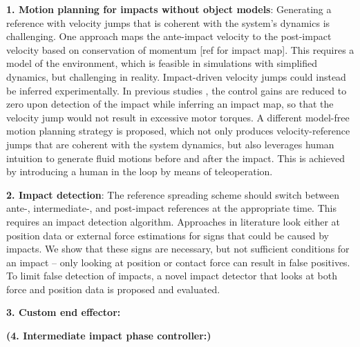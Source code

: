 \documentclass[a4paper, 10pt, conference]{ieeeconf}
\begin{document}
    \textbf{1. Motion planning for impacts without object models}: Generating a reference with velocity jumps that is coherent with the system’s dynamics is challenging. 
    One approach maps the ante-impact velocity to the post-impact velocity based on conservation of momentum [ref for impact map]. This requires a model of the environment, which is feasible in simulations with simplified dynamics, but challenging in reality.
    Impact-driven velocity jumps could instead be inferred experimentally. In previous studies \cite{aouajPredictingPostImpactVelocity2021}, the control gains are reduced to zero upon detection of the impact while inferring an impact map, so that the velocity jump would not result in excessive motor torques.
    A different model-free motion planning strategy is proposed, which not only produces velocity-reference jumps that are coherent with the system dynamics, but also leverages human intuition to generate fluid motions before and after the impact. This is achieved by introducing a human in the loop by means of teleoperation. %

    \textbf{2. Impact detection}: The reference spreading scheme should switch between ante-, intermediate-, and post-impact references at the appropriate time. This requires an impact detection algorithm. Approaches in literature look either at position data \cite{rijnenMotionSignalsVelocity2018} or external force estimations \cite{uitendaalTeachingRobotsInteraction2022,properAimAwareCollisionMonitoring2021,properValidationNumericalSimultaneous2022} for signs that could be caused by impacts. We show that these signs are necessary, but not sufficient conditions for an impact -- only looking at position or contact force can result in false positives. To limit false detection of impacts, a novel impact detector that looks at both force and position data is proposed and evaluated.

    \textbf{3. Custom end effector:}

    \textbf{(4. Intermediate impact phase controller:)}

\end{document}

